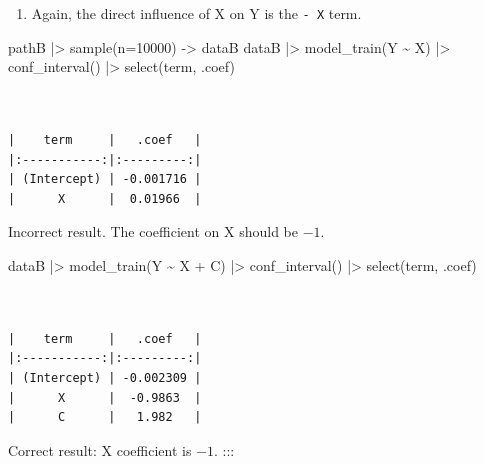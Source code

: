 \documentclass[
  letterpaper,
  DIV=11,
  numbers=noendperiod,
  oneside]{scrartcl}
\newenvironment{Shaded}{\begin{snugshade}}{\end{snugshade}}
\newcommand{\AttributeTok}[1]{\textcolor[rgb]{0.40,0.45,0.13}{#1}}
\newcommand{\DecValTok}[1]{\textcolor[rgb]{0.68,0.00,0.00}{#1}}
\newcommand{\FunctionTok}[1]{\textcolor[rgb]{0.28,0.35,0.67}{#1}}
\newcommand{\NormalTok}[1]{\textcolor[rgb]{0.00,0.23,0.31}{#1}}
\newcommand{\OtherTok}[1]{\textcolor[rgb]{0.00,0.23,0.31}{#1}}
\newcommand{\SpecialCharTok}[1]{\textcolor[rgb]{0.37,0.37,0.37}{#1}}
\providecommand{\tightlist}{%
  \setlength{\itemsep}{0pt}\setlength{\parskip}{0pt}}\usepackage{longtable,booktabs,array}
\begin{document}
\begin{enumerate}
\def\labelenumi{\arabic{enumi}.}
\tightlist
\item
  Again, the direct influence of X on Y is the \texttt{-\ X} term.
\end{enumerate}

\begin{Shaded}
\begin{Highlighting}[]
\NormalTok{pathB }\SpecialCharTok{|\textgreater{}} \FunctionTok{sample}\NormalTok{(}\AttributeTok{n=}\DecValTok{10000}\NormalTok{) }\OtherTok{{-}\textgreater{}}\NormalTok{ dataB}
\NormalTok{dataB }\SpecialCharTok{|\textgreater{}} \FunctionTok{model\_train}\NormalTok{(Y }\SpecialCharTok{\textasciitilde{}}\NormalTok{ X) }\SpecialCharTok{|\textgreater{}} 
  \FunctionTok{conf\_interval}\NormalTok{() }\SpecialCharTok{|\textgreater{}}
  \FunctionTok{select}\NormalTok{(term, .coef)}
\end{Highlighting}
\end{Shaded}

\begin{verbatim}


|    term     |   .coef   |
|:-----------:|:---------:|
| (Intercept) | -0.001716 |
|      X      |  0.01966  |
\end{verbatim}

Incorrect result. The coefficient on X should be \(-1\).

\begin{Shaded}
\begin{Highlighting}[]
\NormalTok{dataB }\SpecialCharTok{|\textgreater{}} \FunctionTok{model\_train}\NormalTok{(Y }\SpecialCharTok{\textasciitilde{}}\NormalTok{ X }\SpecialCharTok{+}\NormalTok{ C) }\SpecialCharTok{|\textgreater{}} 
  \FunctionTok{conf\_interval}\NormalTok{() }\SpecialCharTok{|\textgreater{}}
  \FunctionTok{select}\NormalTok{(term, .coef)}
\end{Highlighting}
\end{Shaded}

\begin{verbatim}


|    term     |   .coef   |
|:-----------:|:---------:|
| (Intercept) | -0.002309 |
|      X      |  -0.9863  |
|      C      |   1.982   |
\end{verbatim}

Correct result: X coefficient is \(-1\). :::

{}
\end{document}
